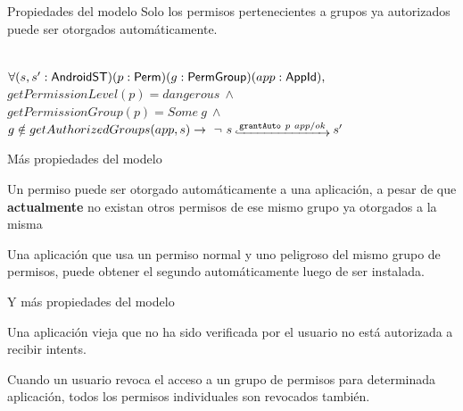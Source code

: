 \documentclass[pdf]{beamer} %
\begin{document}
\begin{frame}{Propiedades del modelo}
    Solo los permisos pertenecientes a grupos ya autorizados puede ser otorgados automáticamente.
    \vspace{20px}
    \begin{prop} \mbox{} \\
        \fontsize{9pt}{15pt}\selectfont
        $\forall (s,s': \mathsf{AndroidST}) (p:\mathsf{Perm}) (g:\mathsf{PermGroup}) (app:\mathsf{AppId}),$ \\
        $getPermissionLevel(p) = dangerous\ \land$ \\
        $getPermissionGroup(p) = Some\ g\ \land$ \\
        $g \notin getAuthorizedGroups(app,s) \rightarrow\ \neg\ \Mathexecrel{s}{\texttt{grantAuto}~p~app/ok}{s'}$ \\
    \end{prop}
\end{frame}

\begin{frame}{Más propiedades del modelo}
    \begin{prop}
        Un permiso puede ser otorgado automáticamente a una aplicación, a pesar de que
        \textbf{actualmente} no existan otros permisos de ese mismo grupo ya otorgados a la misma
    \end{prop}
    \pause \vspace{20px}
    \begin{prop}
        Una aplicación que usa un permiso normal y uno peligroso del mismo grupo de permisos, puede
        obtener el segundo automáticamente luego de ser instalada.
    \end{prop}
\end{frame}

\begin{frame}{Y más propiedades del modelo}
    \begin{prop}
        Una aplicación vieja que no ha sido verificada por el usuario no está autorizada a recibir
        intents.
    \end{prop}
    \pause \vspace{20px}
    \begin{prop}
        Cuando un usuario revoca el acceso a un grupo de permisos para determinada aplicación, todos
        los permisos individuales son revocados también.
    \end{prop}
\end{frame}
\end{document}
